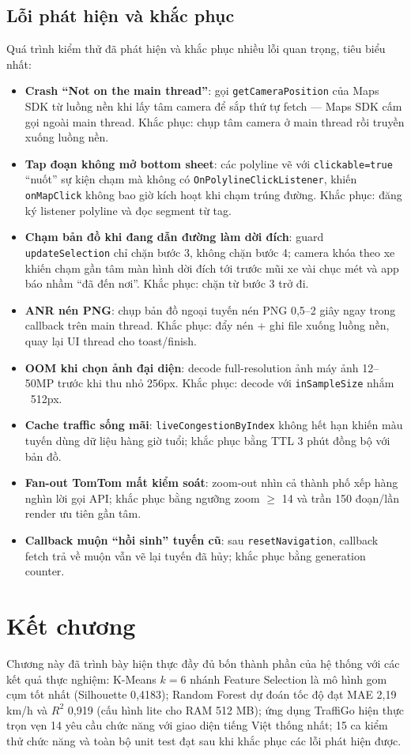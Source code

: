 \subsection{Lỗi phát hiện và khắc phục}
\label{sec:defects}
Quá trình kiểm thử đã phát hiện và khắc phục nhiều lỗi quan trọng, tiêu biểu nhất:

\begin{itemize}[nosep]
 \item \textbf{Crash ``Not on the main thread''}: gọi \texttt{getCameraPosition} của Maps SDK từ luồng nền khi lấy tâm camera để sắp thứ tự fetch --- Maps SDK cấm gọi ngoài main thread. Khắc phục: chụp tâm camera ở main thread rồi truyền xuống luồng nền.
 \item \textbf{Tap đoạn không mở bottom sheet}: các polyline vẽ với \texttt{clickable=true} ``nuốt'' sự kiện chạm mà không có \texttt{OnPolylineClickListener}, khiến \texttt{onMapClick} không bao giờ kích hoạt khi chạm trúng đường. Khắc phục: đăng ký listener polyline và đọc segment từ tag.
 \item \textbf{Chạm bản đồ khi đang dẫn đường làm dời đích}: guard \texttt{updateSelection} chỉ chặn bước 3, không chặn bước 4; camera khóa theo xe khiến chạm gần tâm màn hình dời đích tới trước mũi xe vài chục mét và app báo nhầm ``đã đến nơi''. Khắc phục: chặn từ bước 3 trở đi.
 \item \textbf{ANR nén PNG}: chụp bản đồ ngoại tuyến nén PNG 0,5--2 giây ngay trong callback trên main thread. Khắc phục: đẩy nén + ghi file xuống luồng nền, quay lại UI thread cho toast/finish.
 \item \textbf{OOM khi chọn ảnh đại diện}: decode full-resolution ảnh máy ảnh 12--50MP trước khi thu nhỏ 256px. Khắc phục: decode với \texttt{inSampleSize} nhắm ~512px.
 \item \textbf{Cache traffic sống mãi}: \texttt{liveCongestionByIndex} không hết hạn khiến màu tuyến dùng dữ liệu hàng giờ tuổi; khắc phục bằng TTL 3 phút đồng bộ với bản đồ.
 \item \textbf{Fan-out TomTom mất kiểm soát}: zoom-out nhìn cả thành phố xếp hàng nghìn lời gọi API; khắc phục bằng ngưỡng zoom $\ge$ 14 và trần 150 đoạn/lần render ưu tiên gần tâm.
 \item \textbf{Callback muộn ``hồi sinh'' tuyến cũ}: sau \texttt{resetNavigation}, callback fetch trả về muộn vẫn vẽ lại tuyến đã hủy; khắc phục bằng generation counter.
\end{itemize}

\section{Kết chương}
Chương này đã trình bày hiện thực đầy đủ bốn thành phần của hệ thống với các kết quả thực nghiệm: K-Means $k=6$ nhánh Feature Selection là mô hình gom cụm tốt nhất (Silhouette 0{,}4183); Random Forest dự đoán tốc độ đạt MAE 2{,}19 km/h và $R^2$ 0{,}919 (cấu hình lite cho RAM 512 MB); ứng dụng TraffiGo hiện thực trọn vẹn 14 yêu cầu chức năng với giao diện tiếng Việt thống nhất; 15 ca kiểm thử chức năng và toàn bộ unit test đạt sau khi khắc phục các lỗi phát hiện được.

